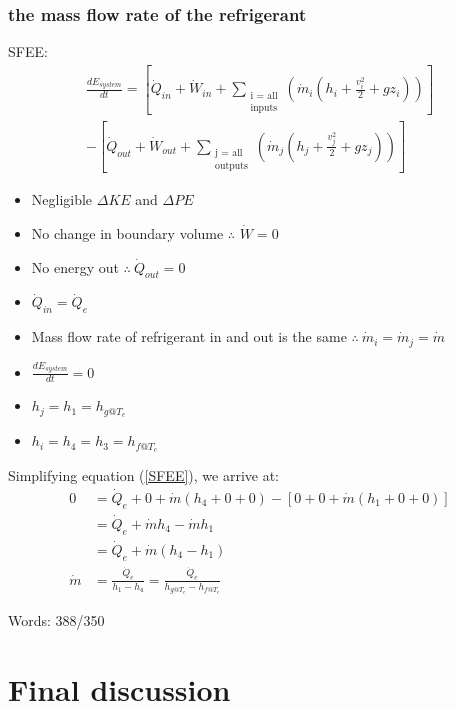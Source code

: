 \documentclass[12pt]{article}
\numberwithin{equation}{section}
\begin{document}
\begin{flushleft}
\subsubsection[Refrigerant mass flow rate.]{the mass flow rate of the refrigerant}
SFEE:
\begin{multline}
  \frac{dE_{system}}{dt} = \left[ \dot{Q}_{in} + \dot{W}_{in} + \sum_{\substack{\text{i = all} \\ \text{inputs}}} \left( \dot{m}_i (h_i + \frac{v_i^2}{2} + gz_i) \right) \right] \\ - \left[ \dot{Q}_{out} + \dot{W}_{out} + \sum_{\substack{\text{j = all} \\ \text{outputs}}} \left( \dot{m}_j (h_j + \frac{v_j^2}{2} + gz_j) \right) \right]
  \label{SFEE}
\end{multline}
\begin{itemize}
  \item Negligible $\Delta KE$ and $\Delta PE$
  \item No change in boundary volume $\therefore$ $\dot{W} = 0$
  \item No energy out $\therefore \ \dot{Q}_{out} = 0$
  \item $\dot{Q}_{in} = \dot{Q}_e$
  \item Mass flow rate of refrigerant in and out is the same $\therefore \ \dot{m}_i =\dot{m}_j = \dot{m}$
  \item $\frac{dE_{system}}{dt} = 0$
  \item $h_j = h_1 = h_{g@T_e}$
  \item $h_i = h_4 = h_3 = h_{f@T_c}$
\end{itemize}  
Simplifying equation (\ref{SFEE}), we arrive at:
\begin{align}
  0 &= \dot{Q}_{e} + 0 + \dot{m} (h_4 + 0 + 0) - \left[ 0 + 0 +  \dot{m} (h_1 + 0 + 0) \right]\\
  &= \dot{Q}_{e} + \dot{m} h_4 - \dot{m} h_1\\
  &= \dot{Q}_{e} + \dot{m} (h_4 - h_1)\\
  \dot{m} &= \frac{\dot{Q}_e}{h_1 - h_4} = \frac{\dot{Q}_e}{h_{g@T_e} - h_{f@T_c}}
\end{align}

Words: 388/350
\section{Final discussion}

\end{flushleft}
\end{document}

